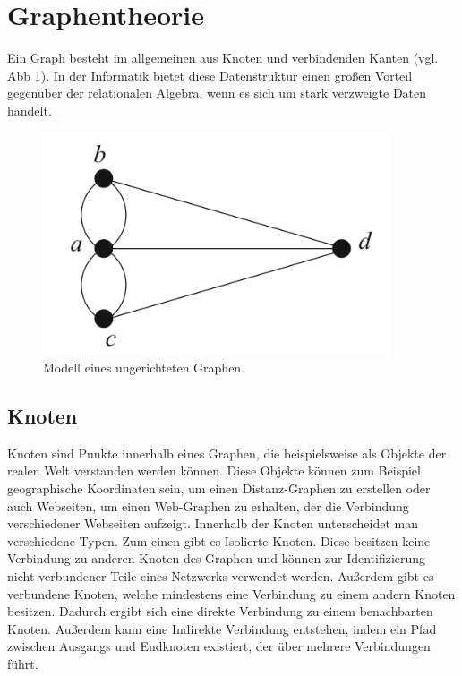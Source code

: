 \section{Graphentheorie} %
\label{sec:graphentheorie}
Ein Graph besteht im allgemeinen aus Knoten und verbindenden Kanten (vgl. Abb 1). In der Informatik bietet diese Datenstruktur einen großen Vorteil gegenüber der relationalen Algebra, wenn es sich um stark verzweigte Daten handelt. \citep{graphTheory}

\begin{figure}[h!]
	\centering
	\includegraphics[scale=1]{Illustrations/graph.png}
	\caption{Modell eines ungerichteten Graphen. \citep{graphTheory}}
\end{figure}
\newpage
\subsection{Knoten} %
\label{sec:knoten}
Knoten sind Punkte innerhalb eines Graphen, die beispielsweise als Objekte der realen Welt verstanden werden können. Diese Objekte können zum Beispiel geographische Koordinaten sein, um einen Distanz-Graphen zu erstellen oder auch Webseiten, um einen Web-Graphen zu erhalten, der die Verbindung verschiedener Webseiten aufzeigt.
Innerhalb der Knoten unterscheidet man verschiedene Typen. Zum einen gibt es Isolierte Knoten. Diese besitzen keine Verbindung zu anderen Knoten des Graphen und können zur Identifizierung nicht-verbundener Teile eines Netzwerks verwendet werden. Außerdem gibt es verbundene Knoten, welche mindestens eine Verbindung zu einem andern Knoten besitzen. Dadurch ergibt sich eine direkte Verbindung zu einem benachbarten Knoten. Außerdem kann eine Indirekte Verbindung entstehen, indem ein Pfad zwischen Ausgangs und Endknoten existiert, der über mehrere Verbindungen führt. \citep{graphTheory} \citep{graphapplication}

